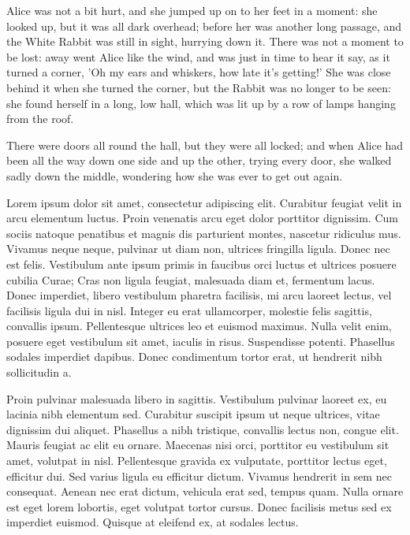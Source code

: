 \documentclass[landscape]{book}
\begin{document}
Alice was not a bit hurt, and she jumped up on to her feet in a moment: she looked up, but it was all dark overhead; before her was another long passage, and the White Rabbit was still in sight, hurrying down it. There was not a moment to be lost: away went Alice like the wind, and was just in time to hear it say, as it turned a corner, 'Oh my ears and whiskers, how late it's getting!' She was close behind it when she turned the corner, but the Rabbit was no longer to be seen: she found herself in a long, low hall, which was lit up by a row of lamps hanging from the roof.

There were doors all round the hall, but they were all locked; and when Alice had been all the way down one side and up the other, trying every door, she walked sadly down the middle, wondering how she was ever to get out again.

Lorem ipsum dolor sit amet, consectetur adipiscing elit. Curabitur feugiat velit in arcu elementum luctus. Proin venenatis arcu eget dolor porttitor dignissim. Cum sociis natoque penatibus et magnis dis parturient montes, nascetur ridiculus mus. Vivamus neque neque, pulvinar ut diam non, ultrices fringilla ligula. Donec nec est felis. Vestibulum ante ipsum primis in faucibus orci luctus et ultrices posuere cubilia Curae; Cras non ligula feugiat, malesuada diam et, fermentum lacus. Donec imperdiet, libero vestibulum pharetra facilisis, mi arcu laoreet lectus, vel facilisis ligula dui in nisl. Integer eu erat ullamcorper, molestie felis sagittis, convallis ipsum. Pellentesque ultrices leo et euismod maximus. Nulla velit enim, posuere eget vestibulum sit amet, iaculis in risus. Suspendisse potenti. Phasellus sodales imperdiet dapibus. Donec condimentum tortor erat, ut hendrerit nibh sollicitudin a.

Proin pulvinar malesuada libero in sagittis. Vestibulum pulvinar laoreet ex, eu lacinia nibh elementum sed. Curabitur suscipit ipsum ut neque ultrices, vitae dignissim dui aliquet. Phasellus a nibh tristique, convallis lectus non, congue elit. Mauris feugiat ac elit eu ornare. Maecenas nisi orci, porttitor eu vestibulum sit amet, volutpat in nisl. Pellentesque gravida ex vulputate, porttitor lectus eget, efficitur dui. Sed varius ligula eu efficitur dictum. Vivamus hendrerit in sem nec consequat. Aenean nec erat dictum, vehicula erat sed, tempus quam. Nulla ornare est eget lorem lobortis, eget volutpat tortor cursus. Donec facilisis metus sed ex imperdiet euismod. Quisque at eleifend ex, at sodales lectus.
\end{document}
